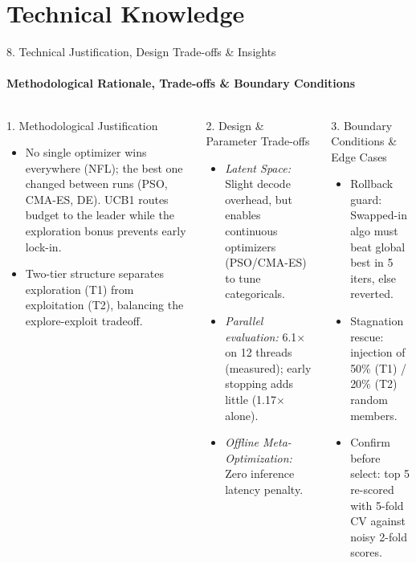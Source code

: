 \documentclass[aspectratio=169, 11pt]{beamer}
\begin{document}
\section{Technical Knowledge}

\begin{frame}{8. Technical Justification, Design Trade-offs \& Insights}
    \framesubtitle{Methodological Rationale, Trade-offs \& Boundary Conditions}
    \begin{columns}[T]
        \begin{block}{1. Methodological Justification}
            \scriptsize
            \begin{itemize}
                \setlength{\itemsep}{1pt}
                \item No single optimizer wins everywhere (NFL); the best one changed between runs (PSO, CMA-ES, DE). UCB1 routes budget to the leader while the exploration bonus prevents early lock-in.
                \item Two-tier structure separates exploration (T1) from exploitation (T2), balancing the explore-exploit tradeoff.
            \end{itemize}
        \end{block}

        \begin{block}{2. Design \& Parameter Trade-offs}
            \scriptsize
            \begin{itemize}
                \setlength{\itemsep}{1pt}
                \item \textit{Latent Space:} Slight decode overhead, but enables continuous optimizers (PSO/CMA-ES) to tune categoricals.
                \item \textit{Parallel evaluation:} 6.1$\times$ on 12 threads (measured); early stopping adds little (1.17$\times$ alone).
                \item \textit{Offline Meta-Optimization:} Zero inference latency penalty.
            \end{itemize}
        \end{block}

        \begin{block}{3. Boundary Conditions \& Edge Cases}
            \scriptsize
            \begin{itemize}
                \setlength{\itemsep}{1pt}
                \item Rollback guard: Swapped-in algo must beat global best in 5 iters, else reverted.
                \item Stagnation rescue: injection of 50\% (T1) / 20\% (T2) random members.
                \item Confirm before select: top 5 re-scored with 5-fold CV against noisy 2-fold scores.
            \end{itemize}
        \end{block}


\end{columns}
\end{frame}
\end{document}
